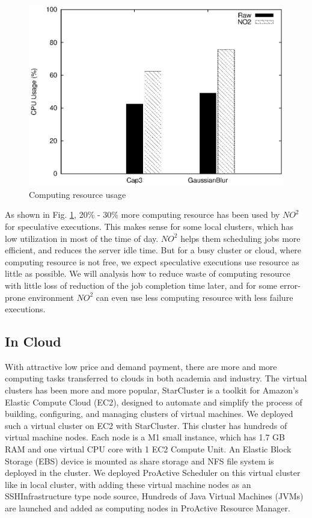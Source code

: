 \begin{figure}
\centering
\includegraphics[width=0.9\columnwidth]{figures/resource_usage.eps}
\caption{Computing resource usage}
\label{figure:resourceusage}
\end{figure}

As shown in Fig. \ref{figure:resourceusage}, 20\% - 30\% more computing resource has been
used by $NO^2$ for speculative executions. This makes sense for some local clusters, which
has low utilization in most of the time of day. $NO^2$ helps them scheduling jobs more
efficient, and reduces the server idle time. But for a busy cluster or cloud, where
computing resource is not free, we expect speculative executions use resource as little as
possible. We will analysis how to reduce waste of computing resource with little loss of
reduction of the job completion time later, and for some error-prone environment $NO^2$
can even use less computing resource with less failure executions.

\subsection{In Cloud}

With attractive low price and demand payment, there are more and more computing tasks
transferred to clouds in both academia and industry. The virtual clusters has been more
and more popular, StarCluster \cite{starcluster} is a toolkit for Amazon’s Elastic Compute
Cloud (EC2), designed to automate and simplify the process of building, configuring, and
managing clusters of virtual machines. We deployed such a virtual cluster on EC2 with
StarCluster. This cluster has hundreds of virtual machine nodes. Each node is a M1 small
instance, which has 1.7 GB RAM and one virtual CPU core with 1 EC2 Compute Unit. An
Elastic Block Storage (EBS) device is mounted as share storage and NFS file system is
deployed in the cluster. We deployed ProActive Scheduler on this virtual cluster like in
local cluster, with adding these virtual machine nodes as an SSHInfrastructure type node
source, Hundreds of Java Virtual Machines (JVMs) are launched and added as computing nodes
in ProActive Resource Manager.

